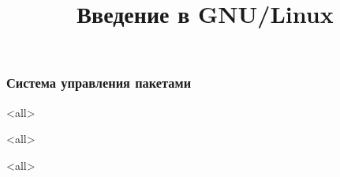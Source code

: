 
\title{Введение в GNU/Linux}









\begin{frame}
	\frametitle{Система управления пакетами}
	\titlepage
	\vspace{-0.5cm}
	\begin{center}
	\end{center}
\end{frame}
\begin{frame}
	\tableofcontents
\end{frame}


\mode<all>{}

\mode<all>{}

\mode<all>{}


